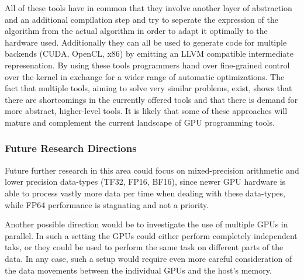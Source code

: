 \documentclass[english,11pt,a4paper,table]{article} %
\begin{document}
All of these tools have in common that they involve another layer of abstraction and an additional compilation step and try to seperate the expression of the algorithm from the actual algorithm in order to adapt it optimally to the hardware used.
Additionally they can all be used to generate code for multiple backends (CUDA, OpenCL, x86) by emitting an LLVM compatible intermediate represenation. 
By using these tools programmers hand over fine-grained control over the kernel in exchange for a wider range of automatic optimizations.
The fact that multiple tools, aiming to solve very similar problems, exist, shows that there are shortcomings in the currently offered tools and that there is demand for more abstract, higher-level tools.
It is likely that some of these approaches will mature and complement the current landscape of GPU programming tools.

\subsubsection{Future Research Directions}
Future further research in this area could focus on mixed-precision arithmetic and lower precision data-types (TF32, FP16, BF16), since newer GPU hardware is able to process vastly more data per time when dealing with these data-types, while FP64 performance is stagnating and not a priority.

Another possible direction would be to investigate the use of multiple GPUs in parallel.
In such a setting the GPUs could either perform completely independent taks, or they could be used to perform the same task on different parts of the data.
In any case, such a setup would require even more careful consideration of the data movements between the individual GPUs and the host's memory.


\newpage
\printbibliography
\end{document}
